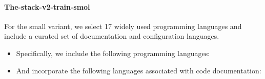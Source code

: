 \documentclass[10pt]{article} %
\begin{document}
\paragraph{The-stack-v2-train-smol} For the small variant, we select 17 widely used programming languages and include a curated set of documentation and configuration languages.
\begin{itemize}
    \item Specifically, we include the following programming languages: 
    \item And incorporate the following languages associated with code documentation: 
\end{itemize}
\end{document}

